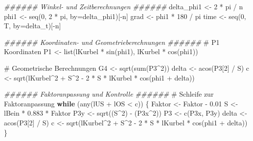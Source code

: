 \documentclass[
  letterpaper,
  DIV=11]{scrartcl}
\newenvironment{Shaded}{\begin{snugshade}}{\end{snugshade}}
\newcommand{\AttributeTok}[1]{\textcolor[rgb]{0.40,0.45,0.13}{#1}}
\newcommand{\CommentTok}[1]{\textcolor[rgb]{0.37,0.37,0.37}{#1}}
\newcommand{\ControlFlowTok}[1]{\textcolor[rgb]{0.00,0.23,0.31}{\textbf{#1}}}
\newcommand{\DecValTok}[1]{\textcolor[rgb]{0.68,0.00,0.00}{#1}}
\newcommand{\DocumentationTok}[1]{\textcolor[rgb]{0.37,0.37,0.37}{\textit{#1}}}
\newcommand{\FloatTok}[1]{\textcolor[rgb]{0.68,0.00,0.00}{#1}}
\newcommand{\FunctionTok}[1]{\textcolor[rgb]{0.28,0.35,0.67}{#1}}
\newcommand{\NormalTok}[1]{\textcolor[rgb]{0.00,0.23,0.31}{#1}}
\newcommand{\OtherTok}[1]{\textcolor[rgb]{0.00,0.23,0.31}{#1}}
\newcommand{\SpecialCharTok}[1]{\textcolor[rgb]{0.37,0.37,0.37}{#1}}
\begin{document}
\begin{Shaded}
\begin{Highlighting}[]
\DocumentationTok{\#\#\#\#\#\# Winkel{-} und Zeitberechnungen \#\#\#\#\#\#}
\NormalTok{delta\_phi1 }\OtherTok{\textless{}{-}} \DecValTok{2} \SpecialCharTok{*}\NormalTok{ pi }\SpecialCharTok{/}\NormalTok{ n}
\NormalTok{phi1 }\OtherTok{\textless{}{-}} \FunctionTok{seq}\NormalTok{(}\DecValTok{0}\NormalTok{, }\DecValTok{2} \SpecialCharTok{*}\NormalTok{ pi, }\AttributeTok{by=}\NormalTok{delta\_phi1)[}\SpecialCharTok{{-}}\NormalTok{n]}
\NormalTok{grad }\OtherTok{\textless{}{-}}\NormalTok{ phi1 }\SpecialCharTok{*} \DecValTok{180} \SpecialCharTok{/}\NormalTok{ pi}
\NormalTok{time }\OtherTok{\textless{}{-}} \FunctionTok{seq}\NormalTok{(}\DecValTok{0}\NormalTok{, T, }\AttributeTok{by=}\NormalTok{delta\_t)[}\SpecialCharTok{{-}}\NormalTok{n]}

\DocumentationTok{\#\#\#\#\#\# Koordinaten{-} und Geometrieberechnungen \#\#\#\#\#\#}
\CommentTok{\# P1 Koordinaten}
\NormalTok{P1 }\OtherTok{\textless{}{-}} \FunctionTok{list}\NormalTok{(lKurbel }\SpecialCharTok{*} \FunctionTok{sin}\NormalTok{(phi1), lKurbel }\SpecialCharTok{*} \FunctionTok{cos}\NormalTok{(phi1))}

\CommentTok{\# Geometrische Berechnungen}
\NormalTok{G4 }\OtherTok{\textless{}{-}} \FunctionTok{sqrt}\NormalTok{(}\FunctionTok{sum}\NormalTok{(P3}\SpecialCharTok{\^{}}\DecValTok{2}\NormalTok{))}
\NormalTok{delta }\OtherTok{\textless{}{-}} \FunctionTok{acos}\NormalTok{(P3[}\DecValTok{2}\NormalTok{] }\SpecialCharTok{/}\NormalTok{ S)}
\NormalTok{c }\OtherTok{\textless{}{-}} \FunctionTok{sqrt}\NormalTok{(lKurbel}\SpecialCharTok{\^{}}\DecValTok{2} \SpecialCharTok{+}\NormalTok{ S}\SpecialCharTok{\^{}}\DecValTok{2} \SpecialCharTok{{-}} \DecValTok{2} \SpecialCharTok{*}\NormalTok{ S }\SpecialCharTok{*}\NormalTok{ lKurbel }\SpecialCharTok{*} \FunctionTok{cos}\NormalTok{(phi1 }\SpecialCharTok{+}\NormalTok{ delta))}

\DocumentationTok{\#\#\#\#\#\# Faktoranpassung und Kontrolle \#\#\#\#\#\#}
\CommentTok{\# Schleife zur Faktoranpassung}
\ControlFlowTok{while}\NormalTok{ (}\FunctionTok{any}\NormalTok{(lUS }\SpecialCharTok{+}\NormalTok{ lOS }\SpecialCharTok{\textless{}}\NormalTok{ c)) \{}
\NormalTok{    Faktor }\OtherTok{\textless{}{-}}\NormalTok{ Faktor }\SpecialCharTok{{-}} \FloatTok{0.01}
\NormalTok{    S }\OtherTok{\textless{}{-}}\NormalTok{ lBein }\SpecialCharTok{*} \FloatTok{0.883} \SpecialCharTok{*}\NormalTok{ Faktor}
\NormalTok{    P3y }\OtherTok{\textless{}{-}} \FunctionTok{sqrt}\NormalTok{((S}\SpecialCharTok{\^{}}\DecValTok{2}\NormalTok{) }\SpecialCharTok{{-}}\NormalTok{ (P3x}\SpecialCharTok{\^{}}\DecValTok{2}\NormalTok{))}
\NormalTok{    P3 }\OtherTok{\textless{}{-}} \FunctionTok{c}\NormalTok{(P3x, P3y)}
\NormalTok{    delta }\OtherTok{\textless{}{-}} \FunctionTok{acos}\NormalTok{(P3[}\DecValTok{2}\NormalTok{] }\SpecialCharTok{/}\NormalTok{ S)}
\NormalTok{    c }\OtherTok{\textless{}{-}} \FunctionTok{sqrt}\NormalTok{(lKurbel}\SpecialCharTok{\^{}}\DecValTok{2} \SpecialCharTok{+}\NormalTok{ S}\SpecialCharTok{\^{}}\DecValTok{2} \SpecialCharTok{{-}} \DecValTok{2} \SpecialCharTok{*}\NormalTok{ S }\SpecialCharTok{*}\NormalTok{ lKurbel }\SpecialCharTok{*} \FunctionTok{cos}\NormalTok{(phi1 }\SpecialCharTok{+}\NormalTok{ delta))}
\NormalTok{\}}


\end{Highlighting}
\end{Shaded}
\end{document}
